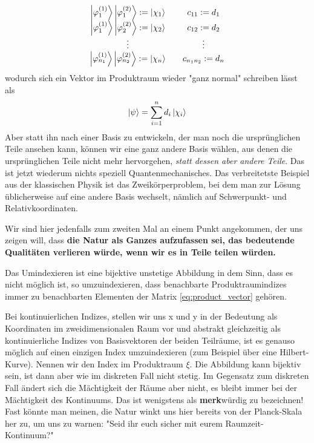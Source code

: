 \documentclass[12pt]{book}
\begin{document}
\begin{equation*}
\begin{matrix}
\ket{\varphi^{(1)}_1} \ket{\varphi^{(2)}_1} := \ket{\chi_1} && c_{11} := d_1 \\
\ket{\varphi^{(1)}_1} \ket{\varphi^{(2)}_2} := \ket{\chi_2} && c_{12} := d_2 \\
\vdots && \vdots  \\
\ket{\varphi^{(1)}_{n_1}} \ket{\varphi^{(2)}_{n_2}} := \ket{\chi_n} && c_{n_1 n_2}  := d_n
\end{matrix}
\end{equation*} 
wodurch sich ein Vektor im Produktraum wieder "ganz normal" schreiben lässt als
\begin{equation*}
\ket{\psi} = \sum_{i=1}^{n} d_i \ket{\chi_i} 
\end{equation*} 
Aber statt ihn nach einer Basis zu entwickeln, der man noch die ursprünglichen Teile ansehen kann, können wir eine ganz andere Basis wählen, aus denen die ursprünglichen Teile nicht mehr hervorgehen, \emph{statt dessen aber andere Teile}. Das ist jetzt wiederum nichts speziell Quantenmechanisches. Das verbreitetste Beispiel aus der klassischen Physik ist das Zweikörperproblem, bei dem man zur Lösung üblicherweise auf eine andere Basis wechselt, nämlich auf Schwerpunkt- und Relativkoordinaten.

Wir sind hier jedenfalls zum zweiten Mal an einem Punkt angekommen, der uns zeigen will, dass \textbf{die Natur als Ganzes aufzufassen sei, das bedeutende Qualitäten verlieren würde, wenn wir es in Teile teilen würden.}

Das Umindexieren ist eine bijektive unstetige Abbildung in dem Sinn, dass es nicht möglich ist, so umzuindexieren, dass benachbarte Produktraumindizes immer zu benachbarten Elementen der Matrix \ref{eq:product_vector} gehören. 

Bei kontinuierlichen Indizes, stellen wir uns x und y in der Bedeutung als Koordinaten im zweidimensionalen Raum vor und abstrakt gleichzeitig als kontinuierliche Indizes von Basisvektoren der beiden Teilräume, ist es genauso möglich auf einen einzigen Index umzuindexieren (zum Beispiel über eine Hilbert-Kurve). Nennen wir den Index im Produktraum $\xi$. Die Abbildung kann bijektiv sein, ist dann aber wie im diskreten Fall nicht stetig. Im Gegensatz zum diskreten Fall ändert sich die Mächtigkeit der Räume aber nicht, es bleibt immer bei der Mächtigkeit des Kontinuums. Das ist wenigstens als \textbf{merk}würdig zu bezeichnen! Fast könnte man meinen, die Natur winkt uns hier bereits von der Planck-Skala her zu, um uns zu warnen: "Seid ihr euch sicher mit eurem Raumzeit-Kontinuum?"
\end{document}
